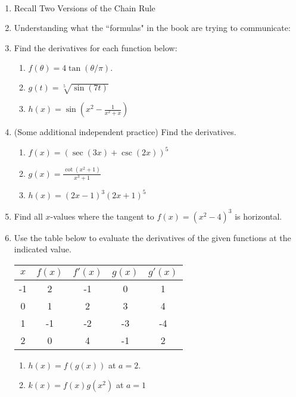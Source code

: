 \documentclass[11pt,fleqn]{article}
\begin{document}
\renewcommand{\headrulewidth}{0pt}
\newcommand{\blank}[1]{\rule{#1}{0.75pt}}
\newcommand{\bc}{\begin{center}}
\newcommand{\ec}{\end{center}}
\renewcommand{\d}{\displaystyle}

\vspace*{-0.7in}

\begin{center}
  \large
  \\
\end{center}
\begin{enumerate}
\item Recall Two Versions of the Chain Rule
\vspace{1in}
\item Understanding what the ``formulas" in the book are trying to communicate:
\vspace{2in}
\item Find the derivatives for each function below:
	\begin{enumerate}
	\item $f(\theta)=4\tan(\theta/\pi).$
	\vfill
	\item $g(t)=\sqrt[5]{\sin(7t)}$
	\vfill
	\item $h(x)=\sin(x^2-\frac{1}{x^2+x})$
	\vfill
	\end{enumerate}
\newpage
\item (Some additional independent practice) Find the derivatives.
	\begin{enumerate}
	\item $f(x)=(\sec(3x)+\csc(2x))^5$
	\vfill
	\item $g(x)=\frac{\cot(x^2+1)}{x^3+1}$
	\vfill
	\item $h(x)=(2x-1)^3(2x+1)^5$
	\vfill
	\end{enumerate}
\item Find all $x$-values where the tangent to $f(x)=(x^2-4)^3$ is horizontal.
\vfill


\item Use the table below to evaluate the derivatives of the given functions at the indicated value.

\begin{multicols}{2}
\begin{tabular}{c||c|c|c|c}
$x$ &$f(x)$ & $f'(x)$ & $g(x)$ & $g'(x)$ \\
\hline \hline
-1 & 2&-1&0&1 \\
\hline
0 & 1&2&3&4 \\
\hline
1& -1&-2&-3&-4 \\
\hline
2&0&4&-1&2\\
\end{tabular}
	\begin{enumerate}
	\item $\displaystyle{h(x)=f(g(x))}$ at $a=2.$
	\vfill
	\item $\displaystyle{k(x)=f(x)g(x^2)}$ at $a=1$
	\vfill
	\end{enumerate}
\end{multicols}
\vspace{.3in}
\end{enumerate}
\end{document}
